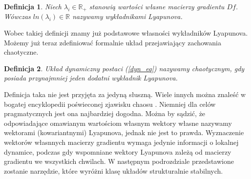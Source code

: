 \documentclass[12pt, twoside]{book}
\newtheorem{defi}{Definicja}
\begin{document}
\begin{defi}
	Niech $ \lambda_{i} \in \mathbb{R}_{+} $ stanowią wartości własne macierzy gradientu $ Df $. Wówczas $ ln(\lambda_{i}) \in \mathbb{R} $ nazywamy wykładnikami Lyapunova.
\end{defi} 
Wobec takiej definicji znamy już podstawowe własności wykładników Lyapunova. \newline
Możemy już teraz zdefiniować formalnie układ przejawiający zachowania chaotyczne.
\begin{defi}
	Układ dynamiczny postaci (\ref{dyn_eq}) nazywamy chaotycznym, gdy posiada przynajmniej jeden dodatni wykładnik Lyapunova.
\end{defi}
Definicja taka nie jest przyjęta za jedyną słuszną. Wiele innych można znaleść w bogatej encyklopedii poświeconej zjawisku chaosu \cite{Encyclopedie}. Niemniej dla celów pragmatycznych jest ona najbardziej dogodna.\newline
Można by sądzić, że odpowiadające omawianym wartościom własnym wektory własne nazywamy wektorami (kowariantnymi) Lyapunova, jednak nie jest to prawda. Wyznaczenie wektorów własnnych macierzy gradientu wymaga jedynie informacji o lokalnej dynamice, podczas gdy wspomniane wektory Lyapunova zależą od macierzy gradientu we wszystkich chwilach. \newline
W następnym podrozdziale przedstawione zostanie narzędzie, które wyróżni klasę układów strukturalnie stabilnych.
\end{document}
